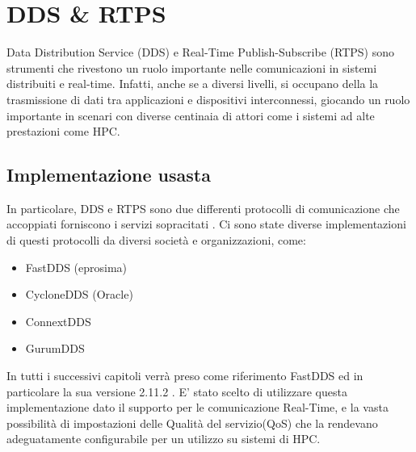 \chapter{DDS \& RTPS}\label{Chapter:dds}
Data Distribution Service (DDS)\cite{DDS} e Real-Time Publish-Subscribe (RTPS)\cite{RTPS} sono strumenti che rivestono un ruolo importante nelle comunicazioni in sistemi distribuiti e real-time. Infatti, anche se a diversi livelli, si occupano della la trasmissione di dati tra applicazioni e dispositivi interconnessi, giocando un ruolo importante in scenari con diverse centinaia di attori come i sistemi ad alte prestazioni come HPC. 


\section{Implementazione usasta}
In particolare, DDS e RTPS sono due differenti protocolli di comunicazione che accoppiati forniscono i servizi sopracitati . Ci sono state diverse implementazioni di questi protocolli da diversi società e organizzazioni, come:
\begin{itemize}
  \item FastDDS (eprosima)
  \item CycloneDDS (Oracle)
  \item ConnextDDS
  \item GurumDDS
\end{itemize}

In tutti i successivi capitoli verrà preso come riferimento FastDDS ed in particolare la sua versione 2.11.2 \cite{FastDDS}. E' stato scelto di utilizzare questa implementazione dato il supporto per le comunicazione Real-Time, e la vasta possibilità di impostazioni delle Qualità del servizio(QoS) che la rendevano adeguatamente configurabile per un utilizzo su sistemi di HPC. %

